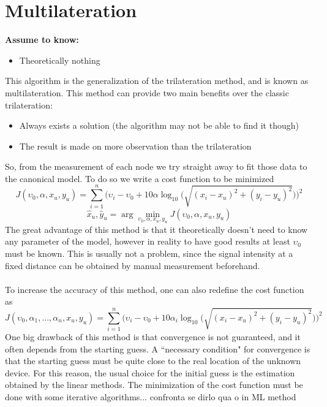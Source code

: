 \documentclass[12pt,twoside]{report}
\begin{document}
\section{Multilateration}
  \begin{center}
  \textbf{Assume to know:}
  \begin{itemize}
    \centering
    \item Theoretically nothing
  \end{itemize}
  \end{center}
This algorithm is the generalization of the trilateration method, and is known as multilateration. 
This method can provide two main benefits over the classic trilateration:
\begin{itemize}
    \item Always exists a solution (the algorithm may not be able to find it though)
    \item The result is made on more observation than the trilateration
\end{itemize}
So, from the measurement of each node we try straight away to fit those data to the canonical model. To do so we write a cost function to be minimized
\begin{equation}
    J(\upsilon_0,\alpha,x_u,y_u)=\sum_{i=1}^n\bigg(\upsilon_i-\upsilon_0+10\alpha\log_{10}\big(\sqrt{(x_i-x_u)^2+(y_i-y_u)^2}\big)\bigg)^2
\end{equation}
\begin{equation}
\hat{x}_u, \hat{y}_u=\arg \min_{\upsilon_0,\alpha,x_u,y_u}J(\upsilon_0,\alpha,x_u,y_u)
\end{equation}
The great advantage of this method is that it theoretically doesn't need to know any parameter of the model, however in reality to have good results at least $\upsilon_0$ must be known. This is usually not a problem, since the signal intensity at a fixed distance can be obtained by manual measurement beforehand.\\\\
To increase the accuracy of this method, one can also redefine the cost function as
\begin{equation}
    J(\upsilon_0,\alpha_1,...,\alpha_n,x_u,y_u)=\sum_{i=1}^n\bigg(\upsilon_i-\upsilon_0+10\alpha_i\log_{10}\big(\sqrt{(x_i-x_u)^2+(y_i-y_u)^2}\big)\bigg)^2
\end{equation}
One big drawback of this method is that convergence is not guaranteed, and it often depends from the starting guess. A ``necessary condition" for convergence is that the starting guess must be quite close to the real location of the unknown device. For this reason, the usual choice for the initial guess is the estimation obtained by the linear methods. The minimization of the cost function must be done with some iterative algorithms... confronta se dirlo qua o in ML method
\clearpage
\end{document}
